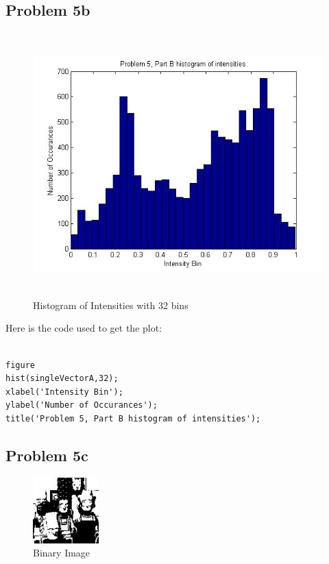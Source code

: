 \documentclass[11pt,psfig]{article}
\begin{document}
\subsection*{Problem 5b}

\begin{figure}[H]
\centering
\includegraphics[height=4in]{prob5partBplot.jpg}
\caption{Histogram of Intensities with 32 bins}
\end{figure}

Here is the code used to get the plot:

\begin{verbatim}

figure
hist(singleVectorA,32);
xlabel('Intensity Bin');
ylabel('Number of Occurances');
title('Problem 5, Part B histogram of intensities');

\end{verbatim}

\subsection*{Problem 5c}

\begin{figure}[H]
\centering
\includegraphics[height=1in]{partCimage.jpg}
\caption{Binary Image}
\end{figure}
\end{document}
